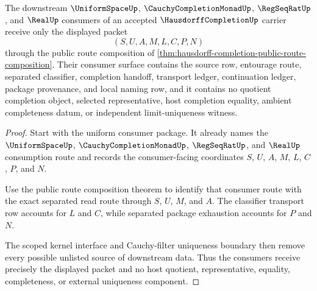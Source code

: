 \begin{theorem}
\label{thm:hausdorff-completion-downstream-exactness-package}
The downstream $\UniformSpaceUp$, $\CauchyCompletionMonadUp$, $\RegSeqRatUp$, and $\RealUp$ consumers of an accepted $\HausdorffCompletionUp$ carrier receive only the displayed packet
$$
(S,U,A,M,L,C,P,N)
$$
through the public route composition of \autoref{thm:hausdorff-completion-public-route-composition}. Their consumer surface contains the source row, entourage route, separated classifier, completion handoff, transport ledger, continuation ledger, package provenance, and local naming row, and it contains no quotient completion object, selected representative, host completion equality, ambient completeness datum, or independent limit-uniqueness witness.
\end{theorem}
\begin{proof}
Start with the uniform consumer package. It already names the $\UniformSpaceUp$, $\CauchyCompletionMonadUp$, $\RegSeqRatUp$, and $\RealUp$ consumption route and records the consumer-facing coordinates $S$, $U$, $A$, $M$, $L$, $C$, $P$, and $N$.

Use the public route composition theorem to identify that consumer route with the exact separated read route through $S$, $U$, $M$, and $A$. The classifier transport row accounts for $L$ and $C$, while separated package exhaustion accounts for $P$ and $N$.

The scoped kernel interface and Cauchy-filter uniqueness boundary then remove every possible unlisted source of downstream data. Thus the consumers receive precisely the displayed packet and no host quotient, representative, equality, completeness, or external uniqueness component.
\end{proof}

